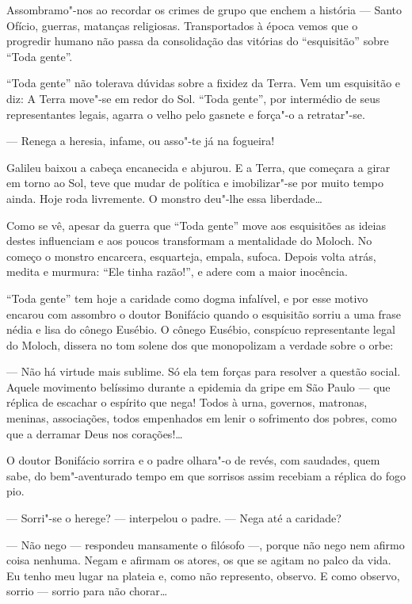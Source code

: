 Assombramo"-nos ao recordar os crimes de grupo que enchem a história ---
Santo Ofício, guerras, matanças religiosas. Transportados à época vemos
que o progredir humano não passa da consolidação das vitórias do
``esquisitão'' sobre ``Toda gente''.

``Toda gente'' não tolerava dúvidas sobre a fixidez da Terra. Vem um
esquisitão e diz: A Terra move"-se em redor do Sol. ``Toda gente'', por
intermédio de seus representantes legais, agarra o velho pelo gasnete e
força"-o a retratar"-se.

--- Renega a heresia, infame, ou asso"-te já na fogueira!

Galileu baixou a cabeça encanecida e abjurou. E a Terra, que começara a
girar em torno ao Sol, teve que mudar de política e imobilizar"-se por
muito tempo ainda. Hoje roda livremente. O monstro deu"-lhe essa
liberdade\ldots{}

Como se vê, apesar da guerra que ``Toda gente'' move aos esquisitões as
ideias destes influenciam e aos poucos transformam a mentalidade do
Moloch. No começo o monstro encarcera, esquarteja, empala, sufoca.
Depois volta atrás, medita e murmura: ``Ele tinha razão!'', e adere com
a maior inocência.

``Toda gente'' tem hoje a caridade como dogma infalível, e por esse
motivo encarou com assombro o doutor Bonifácio quando o esquisitão
sorriu a uma frase nédia e lisa do cônego Eusébio. O cônego Eusébio,
conspícuo representante legal do Moloch, dissera no tom solene dos que
monopolizam a verdade sobre o orbe:

--- Não há virtude mais sublime. Só ela tem forças para resolver a
questão social. Aquele movimento belíssimo durante a epidemia da gripe
em São Paulo --- que réplica de escachar o espírito que nega! Todos à
urna, governos, matronas, meninas, associações, todos empenhados em
lenir o sofrimento dos pobres, como que a derramar Deus nos corações!\ldots{}

O doutor Bonifácio sorrira e o padre olhara"-o de revés, com saudades,
quem sabe, do bem"-aventurado tempo em que sorrisos assim recebiam a
réplica do fogo pio.

--- Sorri"-se o herege? --- interpelou o padre. --- Nega até a caridade?

--- Não nego --- respondeu mansamente o filósofo ---, porque não nego
nem afirmo coisa nenhuma. Negam e afirmam os atores, os que se agitam no
palco da vida. Eu tenho meu lugar na plateia e, como não represento,
observo. E como observo, sorrio --- sorrio para não chorar\ldots{}

